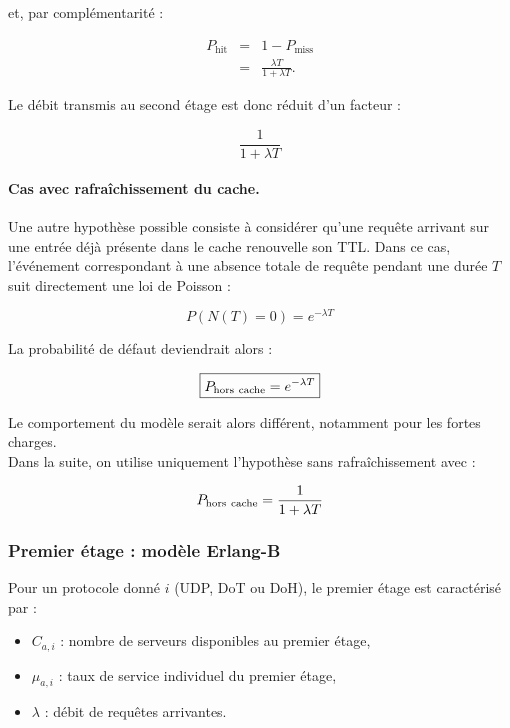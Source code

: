\documentclass[12pt, a4paper]{report}
\begin{document}
	\noindent et, par complémentarité :

	\begin{eqnarray}
	P_{\mathrm{hit}}
	&=&
	1-P_{\mathrm{miss}}\\[1ex]
	&=&
	\frac{\lambda T}{1+\lambda T}.
	\end{eqnarray}

	\noindent Le débit transmis au second étage est donc réduit d'un facteur :

	\[
	\frac{1}{1+\lambda T}
	\]


	\paragraph{Cas avec rafraîchissement du cache.}


	\noindent Une autre hypothèse possible consiste à considérer qu'une requête
	arrivant sur une entrée déjà présente dans le cache renouvelle son
	TTL.
	Dans ce cas, l'événement correspondant à une absence totale de requête
	pendant une durée $T$ suit directement une loi de Poisson :


	\[
	P(N(T)=0)=e^{-\lambda T}
	\]


	\noindent La probabilité de défaut deviendrait alors :


	\[
	\boxed{
	P_{\rm hors~cache}=e^{-\lambda T}
	}
	\]


	\noindent Le comportement du modèle serait alors différent, notamment pour les
	fortes charges.\\


	\noindent Dans la suite, on utilise uniquement l'hypothèse sans rafraîchissement
	avec :

	\[
	P_{\rm hors~cache}=\frac{1}{1+\lambda T}
	\]


	\subsubsection{Premier étage : modèle Erlang-B}


	\noindent Pour un protocole donné $i$ (UDP, DoT ou DoH), le premier étage est
	caractérisé par :

	\begin{itemize}
	\item $C_{a,i}$ : nombre de serveurs disponibles au premier étage,
	\item $\mu_{a,i}$ : taux de service individuel du premier étage,
	\item $\lambda$ : débit de requêtes arrivantes.
	\end{itemize}
\end{document}
